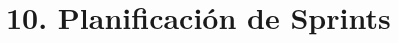 \documentclass[
11pt, %
]{charter}
\begin{document}
\section{10. Planificación de Sprints}





\end{document}
